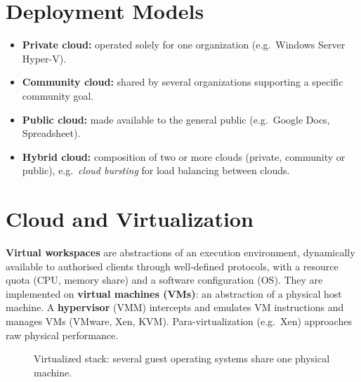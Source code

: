 \section{Deployment Models}
\begin{itemize}[leftmargin=*]
  \item \textbf{Private cloud:} operated solely for one organization (e.g.\ Windows Server Hyper-V).
  \item \textbf{Community cloud:} shared by several organizations supporting a specific community goal.
  \item \textbf{Public cloud:} made available to the general public (e.g.\ Google Docs, Spreadsheet).
  \item \textbf{Hybrid cloud:} composition of two or more clouds (private, community or public),
        e.g.\ \emph{cloud bursting} for load balancing between clouds.
\end{itemize}

\section{Cloud and Virtualization}
\textbf{Virtual workspaces} are abstractions of an execution environment, dynamically available to
authorised clients through well-defined protocols, with a resource quota (CPU, memory share) and a
software configuration (OS). They are implemented on \textbf{virtual machines (VMs)}: an abstraction
of a physical host machine. A \textbf{hypervisor} (VMM) intercepts and emulates VM instructions and
manages VMs (VMware, Xen, KVM). Para-virtualization (e.g.\ Xen) approaches raw physical performance.

\begin{figure}[H]
\centering
{}
\caption{Virtualized stack: several guest operating systems share one physical machine.}
\end{figure}

